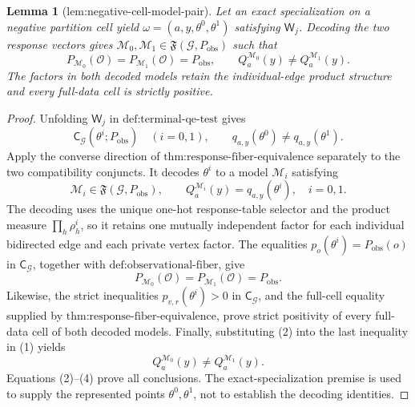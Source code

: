 \documentclass{article}
\newtheorem{lemma}{Lemma}
\begin{document}
\begin{lemma}[lem:negative-cell-model-pair]\label{lem:negative-cell-model-pair}
Let an exact specialization on a negative partition cell yield \(\omega=(a,y,\theta^0,\theta^1)\) satisfying \(\mathsf W_j\). Decoding the two response vectors gives \(\mathcal M_0,\mathcal M_1\in\mathfrak F(\mathcal G,P_{\mathrm{obs}})\) such that
\[
P_{\mathcal M_0}(\mathcal O)=P_{\mathcal M_1}(\mathcal O)=P_{\mathrm{obs}},
\qquad
Q_a^{\mathcal M_0}(y)\neq Q_a^{\mathcal M_1}(y).
\]
The factors in both decoded models retain the individual-edge product structure and every full-data cell is strictly positive.
\end{lemma}
\begin{proof}
Unfolding \(\mathsf W_j\) in \(\text{def:terminal-qe-test}\) gives
\[
\mathsf C_{\mathcal G}(\theta^i;P_{\mathrm{obs}})
\quad(i=0,1),
\qquad
q_{a,y}(\theta^0)\neq q_{a,y}(\theta^1).
\tag{1}
\]
Apply the converse direction of \(\text{thm:response-fiber-equivalence}\) separately to the two compatibility conjuncts.  It decodes \(\theta^i\) to a model \(\mathcal M_i\) satisfying
\[
\mathcal M_i\in\mathfrak F(\mathcal G,P_{\mathrm{obs}}),
\qquad
Q_a^{\mathcal M_i}(y)=q_{a,y}(\theta^i),
\quad i=0,1.
\tag{2}
\]
The decoding uses the unique one-hot response-table selector and the product measure \(\prod_h\rho_h^i\), so it retains one mutually independent factor for each individual bidirected edge and each private vertex factor.  The equalities \(p_o(\theta^i)=P_{\mathrm{obs}}(o)\) in \(\mathsf C_{\mathcal G}\), together with \(\text{def:observational-fiber}\), give
\[
P_{\mathcal M_0}(\mathcal O)=P_{\mathcal M_1}(\mathcal O)=P_{\mathrm{obs}}.
\tag{3}
\]
Likewise, the strict inequalities \(p_{v,r}(\theta^i)>0\) in \(\mathsf C_{\mathcal G}\), and the full-cell equality supplied by \(\text{thm:response-fiber-equivalence}\), prove strict positivity of every full-data cell of both decoded models.  Finally, substituting (2) into the last inequality in (1) yields
\[
Q_a^{\mathcal M_0}(y)\neq Q_a^{\mathcal M_1}(y).
\tag{4}
\]
Equations (2)--(4) prove all conclusions.  The exact-specialization premise is used to supply the represented points \(\theta^0,\theta^1\), not to establish the decoding identities.
\end{proof}
\end{document}
